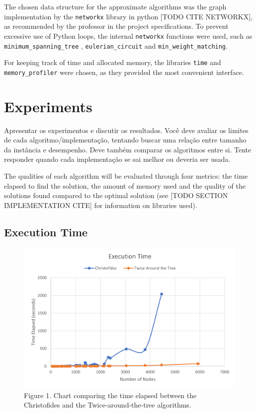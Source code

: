 \documentclass[12pt]{article}
\begin{document}
The chosen data structure for the approximate algorithms was the graph implementation 
by the \texttt{networkx} library in python [TODO CITE NETWORKX], as recommended by 
the professor in the project specifications. To prevent excessive use of Python loops, 
the internal \texttt{networkx} functions were used, such as \texttt{minimum\_spanning\_tree} , 
\texttt{eulerian\_circuit} and \texttt{min\_weight\_matching}.

For keeping track of time and allocated memory, the libraries \texttt{time} and 
\texttt{memory\_profiler} were chosen, as they provided the most convenient interface.

\section{Experiments} \label{sec:firstpage}
    Apresentar os experimentos e discutir os resultados. Você deve avaliar os
    limites de cada algoritmo/implementação, tentando buscar uma relação entre
    tamanho da instância e desempenho. Deve também comparar os algoritmos
    entre si. Tente responder quando cada implementação se sai melhor ou
    deveria ser usada.

The qualities of each algorithm will be evaluated through four metrics: the time elapsed 
to find the solution, the amount of memory used and the quality of the solutions found 
compared to the optimal solution (see [TODO SECTION IMPLEMENTATION CITE] for information 
on libraries used).

\subsection{Execution Time}

\begin{figure}[ht]
\centering
\includegraphics[width=.5\textwidth]{execution_time_comparison.png}
\caption{Figure 1. Chart comparing the time elapsed between the Christofides and the Twice-around-the-tree algorithms.}
\label{fig:exec_time}
\end{figure}
\end{document}
